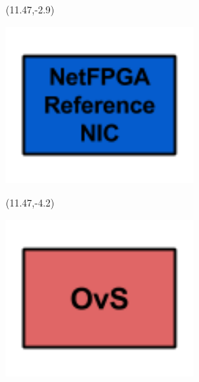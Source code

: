 \documentclass{beamer}
\begin{document}
\begin{frame}
\pause

\begin{textblock}{3}(11.47,-2.9)
\begin{minipage}{\textwidth}
\setlength{\parindent}{0pt}
\setlength{\parskip}{0.1cm}
\includegraphics[width=0.53\textwidth, right]{imagenes/buildingbnetfpga.png}
\end{minipage}
\end{textblock}

\begin{textblock}{3}(11.47,-4.2)
\begin{minipage}{\textwidth}
\setlength{\parindent}{0pt}
\setlength{\parskip}{0.1cm}
\includegraphics[width=0.53\textwidth, right]{imagenes/buildingblockovs.png}
\end{minipage}
\end{textblock}

\end{frame}
\end{document}
